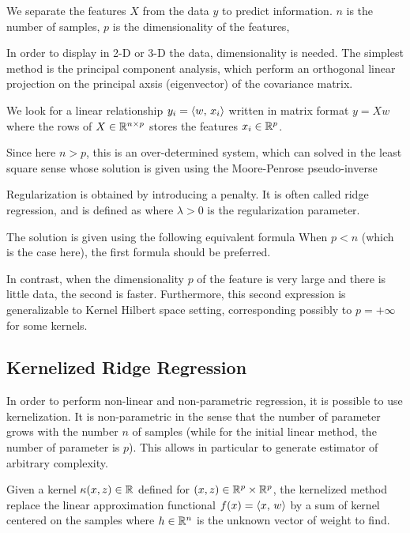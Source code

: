 We separate the features $X$ from the data $y$ to predict information.
$n$ is the number of samples, $p$ is the dimensionality of the features,

In order to display in 2-D or 3-D the data, dimensionality is needed.
The simplest method is the principal component analysis, which perform an
orthogonal linear projection on the principal axsis (eigenvector) of the
covariance matrix.

We look for a linear relationship $ y_i = \langle w,\,x_i\rangle $
written in matrix format $ y= X w $
where the rows of $X \in \mathbb{R}^{n \times p}$ stores the features $x_i \in \mathbb{R}^p$.

Since here $n>p$, this is an over-determined system, which can
solved in the least square sense
whose solution is given using the Moore-Penrose pseudo-inverse

Regularization is obtained by introducing a penalty. It is often called
ridge regression, and is defined as 
where $\lambda>0$ is the regularization parameter.

The solution is given using the following equivalent formula
When $p<n$ (which is the case here), the first formula should be
preferred. 

In contrast, when the dimensionality $p$ of the feature is very
large and there is little data, the second is faster. Furthermore, this
second expression is generalizable to Kernel Hilbert space setting,
corresponding possibly to $p=+\infty$ for some kernels. 


\subsection{Kernelized Ridge Regression}

In order to perform non-linear and non-parametric regression, it is
possible to use  kernelization. It is non-parametric in the sense that the number of
parameter grows with the number $n$ of samples (while for the initial
linear  method, the number of parameter is $p$). This allows in particular to
generate estimator of arbitrary complexity. 

Given a kernel $ \kappa(x,z) \in \mathbb{R} $ defined for $(x,z) \in \mathbb{R}^p \times \mathbb{R}^p$,
the kernelized method replace the linear approximation functional $f(x) =
\langle x,\,w\rangle$ by a sum of kernel centered on the samples 
where $h \in \mathbb{R}^n$ is the unknown vector of weight to find. 

